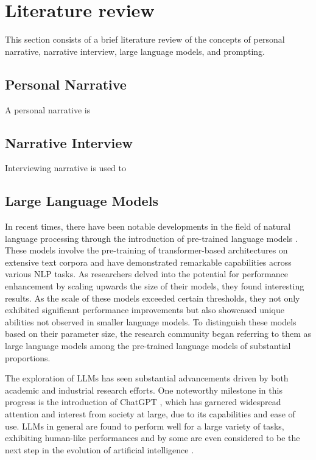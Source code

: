 \chapter{Literature review}
\label{cha:literature_review}
This section consists of a brief literature review of the concepts of personal narrative, narrative interview, large language models, and prompting. 


\section{Personal Narrative}
A personal narrative is \cite{}
\section{Narrative Interview}
Interviewing narrative is used to
\section{Large Language Models}
In recent times, there have been notable developments in the field of natural language processing through the introduction of pre-trained language models \cite{radford2018improving}. These models involve the pre-training of transformer-based architectures \cite{vaswani2017attention} on extensive text corpora and have demonstrated remarkable capabilities across various NLP tasks. As researchers delved into the potential for performance enhancement by scaling upwards the size of their models, they found interesting results. As the scale of these models exceeded certain thresholds, they not only exhibited significant performance improvements but also showcased unique abilities not observed in smaller language models. To distinguish these models based on their parameter size, the research community began referring to them as large language models among the pre-trained language models of substantial proportions. \cite{zhao2023survey,huang2022towards,wei2022emergent}

The exploration of LLMs has seen substantial advancements driven by both academic and industrial research efforts. One noteworthy milestone in this progress is the introduction of ChatGPT \cite{chatgpt}, which has garnered widespread attention and interest from society at large, due to its capabilities and ease of use. LLMs in general are found to perform well for a large variety of tasks, exhibiting human-like performances and by some are even considered to be the next step in the evolution of artificial intelligence \cite{bubeck2023sparks}.  

